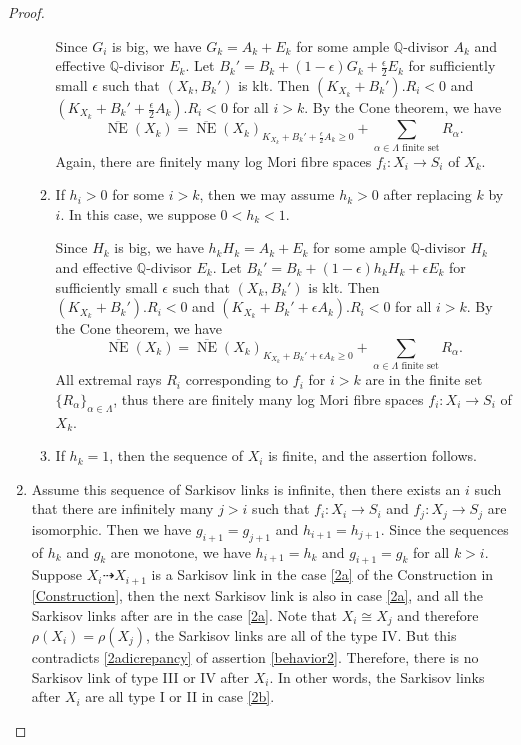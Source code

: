 \begin{proof}
\begin{enumerate}
\begin{enumerate}
                  Since $G_{i}$ is big, we have $G_{k}=A_{k}+E_{k}$ for some ample $\mathbb{Q}$-divisor $A_{k}$ and effective $\mathbb{Q}$-divisor $E_{k}$. Let $B_{k}'=B_{k}+(1-\epsilon)G_{k}+\frac{\epsilon}{2} E_{k}$ for sufficiently small $\epsilon$ such that $(X_{k},B_{k}')$ is klt. Then $(K_{X_{k}}+B_{k}').R_{i}<0$ and $(K_{X_{k}}+B_{k}'+\frac{\epsilon}{2} A_{k}).R_{i}<0$ for all $i>k$. By the Cone theorem, we have
                  \[
                    \overline{\operatorname{NE}}(X_{k})=\overline{\operatorname{NE}}(X_{k})_{K_{X_{k}}+B_{k}'+\frac{\epsilon}{2}A_{k}\geqslant 0} +\sum_{\alpha \in\Lambda\text{ finite set}}R_{\alpha}.
                  \]
                  Again, there are finitely many log Mori fibre spaces $f_{i}:X_{i}\to S_{i}$ of $X_{k}$.

            \item If $h_i>0$ for some $i>k$, then we may assume $h_k>0$ after replacing $k$ by  $i$. In this case, we suppose $0<h_k<1$.

                  Since $H_{k}$ is big, we have $h_{k}H_{k}=A_{k}+E_{k}$ for some ample $\mathbb{Q}$-divisor $H_{k}$ and effective $\mathbb{Q}$-divisor  $E_{k}$. Let $B_{k}'=B_{k}+(1-\epsilon)h_{k}H_{k}+\epsilon E_{k}$ for sufficiently small $\epsilon$ such that $(X_{k},B_{k}')$ is klt. Then $(K_{X_{k}}+B_{k}').R_{i}<0$ and $(K_{X_{k}}+B_{k}'+\epsilon A_{k}).R_{i}<0$ for all $i>k$. By the Cone theorem, we have
                  \[
                    \overline{\operatorname{NE}}(X_{k})=\overline{\operatorname{NE}}(X_{k})_{K_{X_{k}}+B_{k}'+\epsilon A_{k}\geqslant 0} +\sum_{\alpha \in\Lambda\text{ finite set}}R_{\alpha}.
                  \]
                  All extremal rays $R_{i}$ corresponding to $f_{i}$ for $i>k$ are in the finite set $\{R_{\alpha}\}_{\alpha \in \Lambda} $, thus there are finitely many log Mori fibre spaces $f_{i}:X_{i}\to S_{i}$ of $X_{k}$.

            \item If $h_k=1$, then the sequence of $X_i$ is finite, and the assertion follows.
          \end{enumerate}
    \item Assume this sequence of Sarkisov links is infinite, then there exists an  $i$ such that there are infinitely many $j>i$ such that $f_{i}:X_{i}\to S_{i}  $ and $f_{j}:X_{j}\to S_{j}$ are isomorphic. Then we have $g_{i+1}=g_{j+1}$ and $h_{i+1}=h_{j+1}$. Since the sequences of $h_{k}$ and $g_{k}$ are monotone, we have $h_{i+1}=h_{k}$ and  $g_{i+1}=g_{k}$ for all $k>i$. Suppose $X_{i}\dashrightarrow X_{i+1}$ is a Sarkisov link in the case \ref{2a} of the Construction in \ref{Construction}, then the next Sarkisov link is also in case \ref{2a}, and all the Sarkisov links after are in the case \ref{2a}. Note that $X_{i}\cong X_{j}$ and therefore $\rho(X_{i})=\rho(X_{j})$, the Sarkisov links are all of the type IV. But this contradicts \ref{2adicrepancy} of assertion \ref{behavior2}. Therefore, there is no Sarkisov link of type III or IV after $X_{i}$. In other words, the Sarkisov links after $X_{i}$ are all type I or II in case \ref{2b}.


\end{enumerate}
\end{proof}
